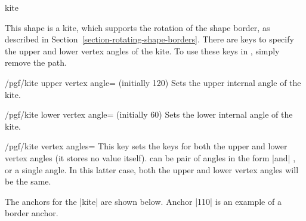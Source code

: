 \par\leavevmode
\begin{shape}{kite}

	This shape is a kite, which supports the rotation of the shape border,
	as described in Section~\ref{section-rotating-shape-borders}.
	There are \pgfname{} keys to specify the upper and lower vertex angles
	of the kite.
	To use these keys in \tikzname, simply remove the 
	path.
	
	\begin{key}{/pgf/kite upper vertex angle= (initially 120)}
	Sets the upper internal angle of the kite.
	\end{key}
	
	\begin{key}{/pgf/kite lower vertex angle= (initially 60)}
	Sets the lower internal angle of the kite.
	\end{key}
	
	\begin{key}{/pgf/kite vertex angles=}
		This key sets the keys for both the upper and lower vertex angles
		(it stores no value itself).
	    can be pair of angles in the form
	    |and| , or a single angle.
	   In this latter case, both the upper and lower vertex angles will
	   be the same.
	\end{key}%

\begin{codeexample}[]
\end{codeexample}


	The anchors for the |kite| are shown below. Anchor |110| is an
	example of a border anchor.
	
\begin{codeexample}[]
\Huge
{}
\end{codeexample}
\end{shape}


